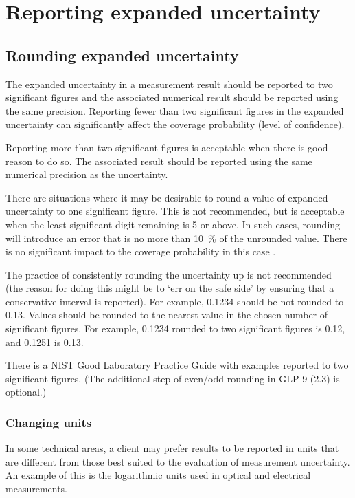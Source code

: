 \section{Reporting expanded uncertainty}
\subsection{Rounding expanded uncertainty}
The expanded uncertainty in a measurement result should be reported to two significant figures and the associated numerical result should be reported using the same precision. Reporting fewer than two significant figures in the expanded uncertainty can significantly affect the coverage probability (level of confidence). 
 
Reporting more than two significant figures is acceptable when there is good reason to do so. The associated result should be reported using the same numerical precision as the uncertainty.

There are situations where it may be desirable to round a value of expanded uncertainty to one significant figure. This is not recommended, but is acceptable when the least significant digit remaining is 5 or above. In such cases, rounding will introduce an error that is no more than \SI{10}{\%} of the unrounded value. There is no significant impact to the coverage probability in this case \cite{HALL_19}.

The practice of consistently rounding the uncertainty up is not recommended (the reason for doing this might be to `err on the safe side' by ensuring that a conservative interval is reported). For example, 0.1234 should be not rounded to 0.13. Values should be rounded to the nearest value in the chosen number of significant figures. For example, 0.1234 rounded to two significant figures is 0.12, and 0.1251 is 0.13. 

There is a NIST Good Laboratory Practice Guide \cite{GLP9} with examples reported to two significant figures. (The additional step of even/odd rounding in GLP 9 (2.3) is optional.)

\subsubsection{Changing units}
In some technical areas, a client may prefer results to be reported in units that are different from those best suited to the evaluation of measurement uncertainty. An example of this is the logarithmic units used in optical and electrical measurements. 

